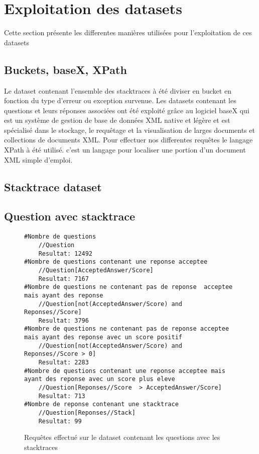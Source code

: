 \section{Exploitation des datasets}
Cette section présente les differentes manières utilisées pour l'exploitation de ces datasets
\subsection{Buckets, baseX, XPath}
Le dataset contenant l'ensemble des stacktraces à été diviser en bucket en fonction du type d'erreur ou exception survenue.
Les datasets contenant les questions et leurs réponses associées ont été exploité grâce au logiciel baseX qui  est un système de gestion de base de données XML native et légère et est spécialisé dans le stockage, le requêtage et la visualisation de larges documents et collections de documents XML.
Pour effectuer nos differentes requêtes le langage XPath à été utilisé. c'est un langage pour localiser une portion d'un document XML simple d'emploi.

\subsection{Stacktrace dataset}
\subsection{Question avec stacktrace}
\begin{figure}
\begin{lstlisting}
#Nombre de questions
    //Question
    Resultat: 12492
#Nombre de questions contenant une reponse acceptee
    //Question[AcceptedAnswer/Score]
    Resultat: 7167
#Nombre de questions ne contenant pas de reponse  acceptee mais ayant des reponse
    //Question[not(AcceptedAnswer/Score) and Reponses//Score]
    Resultat: 3796
#Nombre de questions ne contenant pas de reponse acceptee mais ayant des reponse avec un score positif
    //Question[not(AcceptedAnswer/Score) and Reponses//Score > 0] 
    Resultat: 2283
#Nombre de questions contenant une reponse acceptee mais ayant des reponse avec un score plus eleve
    //Question[Reponses//Score  > AcceptedAnswer/Score]
    Resultat: 713
#Nombre de reponse contenant une stacktrace
    //Question[Reponses//Stack]
    Resultat: 99
\end{lstlisting}
\caption{Requêtes effectué sur le dataset contenant les questions avec les stacktraces}
\label{code:resultatAvecStack}
\end{figure}

